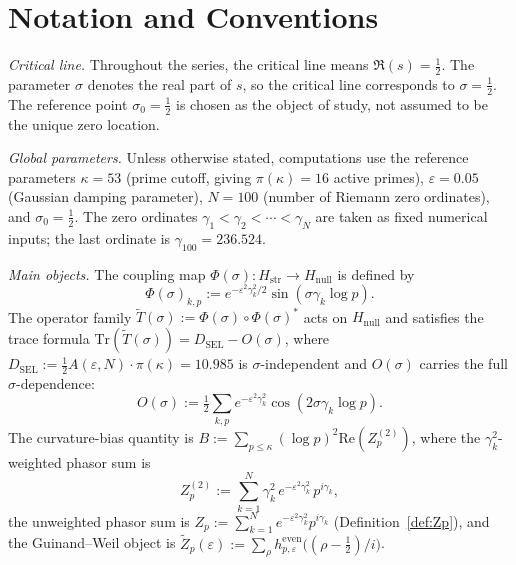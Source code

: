 \documentclass[11pt]{article}
\newcommand{\Hstr}{H_{\mathrm{str}}}
\newcommand{\Hnull}{H_{\mathrm{null}}}
\newcommand{\Tt}{\widetilde{T}}
\newcommand{\Zt}{\widetilde{Z}}
\newcommand{\DSEL}{D_{\mathrm{SEL}}}
\begin{document}
\vspace{2em}

\section*{Notation and Conventions}
\label{sec:notation}

\emph{Critical line.}
Throughout the series, the critical line means $\Re(s)=\tfrac12$.
The parameter $\sigma$ denotes the real part of $s$, so the critical
line corresponds to $\sigma=\tfrac12$.
The reference point $\sigma_0=\tfrac12$ is chosen as the object of
study, not assumed to be the unique zero location.

\medskip
\emph{Global parameters.}
Unless otherwise stated, computations use the reference parameters
$\kappa=53$ (prime cutoff, giving $\pi(\kappa)=16$ active primes),
$\varepsilon=0.05$ (Gaussian damping parameter),
$N=100$ (number of Riemann zero ordinates), and
$\sigma_0=\tfrac12$.
The zero ordinates $\gamma_1<\gamma_2<\cdots<\gamma_N$ are taken
as fixed numerical inputs; the last ordinate is $\gamma_{100}=236.524$.

\medskip
\emph{Main objects.}
The coupling map $\Phi(\sigma)\colon\Hstr\to\Hnull$ is defined by
\[
\Phi(\sigma)_{k,p}
  :=e^{-\varepsilon^2\gamma_k^2/2}\sin(\sigma\gamma_k\log p).
\]
The operator family $\Tt(\sigma):=\Phi(\sigma)\circ\Phi(\sigma)^*$
acts on $\Hnull$ and satisfies the trace formula
$\mathrm{Tr}(\Tt(\sigma))=\DSEL-O(\sigma)$, where
$\DSEL:=\tfrac12 A(\varepsilon,N)\cdot\pi(\kappa)=10.985$ is
$\sigma$-independent and $O(\sigma)$ carries the full
$\sigma$-dependence:
\[
O(\sigma):=\tfrac12\sum_{k,p}e^{-\varepsilon^2\gamma_k^2}
\cos(2\sigma\gamma_k\log p).
\]
The curvature-bias quantity is
$B:=\sum_{p\leq\kappa}(\log p)^2\mathrm{Re}(Z_p^{(2)})$, where
the $\gamma_k^2$-weighted phasor sum is
\[
Z_p^{(2)}:=\sum_{k=1}^N \gamma_k^2\,
e^{-\varepsilon^2\gamma_k^2}\,p^{i\gamma_k},
\]
the unweighted phasor sum is
$Z_p:=\sum_{k=1}^N e^{-\varepsilon^2\gamma_k^2}p^{i\gamma_k}$
(Definition~\ref{def:Zp}), and the Guinand--Weil object is
$\Zt_p(\varepsilon):=\sum_\rho h^{\mathrm{even}}_{p,\varepsilon}
\bigl((\rho-\tfrac12)/i\bigr)$.
\end{document}
